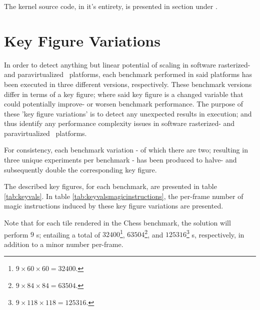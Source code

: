 The kernel source code, in it's entirety, is presented in section  under .

\section{Key Figure Variations}
\label{sec:methodologyexperiment_keyfigurevariations}
In order to detect anything but linear potential of scaling in software rasterized- and paravirtualized \dvttermsimics\ platforms, each benchmark performed in said platforms has been executed in three different versions, respectively.
These benchmark versions differ in terms of a key figure; where said key figure is a changed variable that could potentially improve- or worsen benchmark performance.
The purpose of these 'key figure variations' is to detect any unexpected results in execution; and thus identify any performance complexity issues in software rasterized- and paravirtualized \dvttermsimics\ platforms.

For consistency, each benchmark variation - of which there are two; resulting in three unique experiments per benchmark - has been produced to halve- and subsequently double the corresponding key figure.

\noindent
The described key figures, for each benchmark, are presented in table \ref{tab:keyvals}.
In table \ref{tab:keyvalsmagicinstructions}, the per-frame number of magic instructions induced by these key figure variations are presented.





Note that for each tile rendered in the Chess benchmark, the solution will perform $9$ \dvttermmagicinstruction s; entailing a total of $32400$\footnote{$9\times60\times60=32400$.}, $63504$\footnote{$9\times84\times84=63504$.}, and $125316$\footnote{$9\times118\times118=125316$.} \dvttermmagicinstruction s, respectively, in addition to a minor number per-frame.